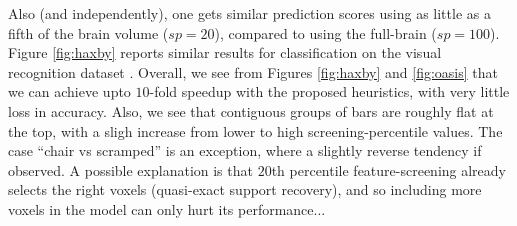 Also (and independently), one gets similar prediction scores using as
little as a fifth of the brain volume ($sp=20$),
compared to using the full-brain ($sp=100$).
Figure \ref{fig:haxby} reports similar results for classification on
the visual recognition dataset  \citep{haxby2001}. Overall, we see from
Figures \ref{fig:haxby} and \ref{fig:oasis} that we can achieve upto
$10$-fold speedup with the proposed heuristics, with very little loss
in accuracy. Also, we see that contiguous groups of bars are roughly flat at the top, with a
    sligh increase from lower to high screening-percentile values. The
    case ``chair vs scramped'' is an exception, where a slightly reverse tendency
    if observed. A possible explanation is that $20$th percentile
    feature-screening already selects the right voxels (quasi-exact
    support recovery), and so including more voxels in the model can only hurt its
    performance...    

